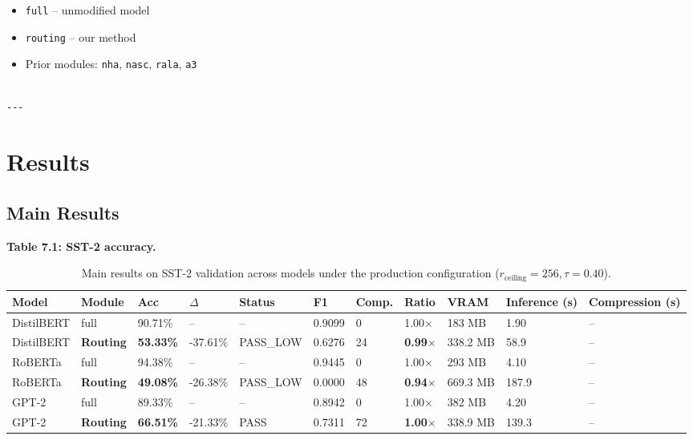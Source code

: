 \begin{itemize}
\item \texttt{full} -- unmodified model
\item \texttt{routing} -- our method
\item Prior modules: \texttt{nha}, \texttt{nasc}, \texttt{rala}, \texttt{a3}
\end{itemize}
\begin{lstlisting}

---
\end{lstlisting}


\section{Results}

\subsection{Main Results}

\textbf{Table 7.1: SST-2 accuracy.}

\begin{table}[t]
\centering
\small
\begin{tabular}{lllllllllll}
\toprule
\textbf{Model} & \textbf{Module} & \textbf{Acc} & \textbf{$\Delta$} & \textbf{Status} & \textbf{F1} & \textbf{Comp.} & \textbf{Ratio} & \textbf{VRAM} & \textbf{Inference (s)} & \textbf{Compression (s)} \\
\midrule
DistilBERT & full & 90.71\% & -- & -- & 0.9099 & 0 & 1.00$\times$ & 183 MB & 1.90 & -- \\
DistilBERT & \textbf{Routing} & \textbf{53.33\%} & -37.61\% & PASS\_LOW & 0.6276 & 24 & \textbf{0.99$\times$} & 338.2 MB & 58.9 & -- \\
RoBERTa & full & 94.38\% & -- & -- & 0.9445 & 0 & 1.00$\times$ & 293 MB & 4.10 & -- \\
RoBERTa & \textbf{Routing} & \textbf{49.08\%} & -26.38\% & PASS\_LOW & 0.0000 & 48 & \textbf{0.94$\times$} & 669.3 MB & 187.9 & -- \\
GPT-2 & full & 89.33\% & -- & -- & 0.8942 & 0 & 1.00$\times$ & 382 MB & 4.20 & -- \\
GPT-2 & \textbf{Routing} & \textbf{66.51\%} & -21.33\% & PASS & 0.7311 & 72 & \textbf{1.00$\times$} & 338.9 MB & 139.3 & -- \\
\bottomrule
\end{tabular}
\caption{Main results on SST-2 validation across models under the production configuration ($r_{\mathrm{ceiling}}=256, \tau=0.40$).}
\label{tab:main_sst2}
\end{table}

